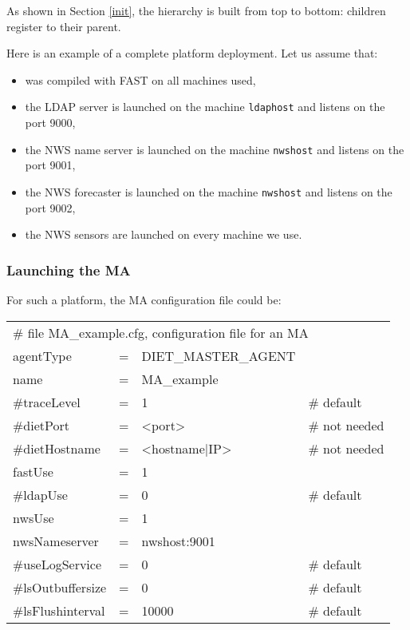 As shown in Section \ref{init}, the hierarchy is built from top to bottom:
children register to their parent.

Here is an example of a complete platform deployment. Let us assume that:

\begin{itemize}
\item \diet was compiled with FAST on all machines used,
\item the LDAP server is launched on the machine \texttt{ldaphost} and listens
  on the port 9000,
\item the NWS name server is launched on the machine \texttt{nwshost} and
  listens on the port 9001,
\item the NWS forecaster is launched on the machine \texttt{nwshost} and
  listens on the port 9002,
\item the NWS sensors are launched on every machine we use.
\end{itemize}


\subsubsection{Launching the MA}

For such a platform, the MA configuration file could be:
\tt
\begin{center}
 \footnotesize
 \begin{tabular}{lcll}
  \multicolumn{4}{l}{\# file MA\_example.cfg, configuration file for an MA}\\
  agentType     &=&DIET\_MASTER\_AGENT&\\
  name          &=&MA\_example        &\\
  \#traceLevel  &=&1                  &\# default\\
  \#dietPort    &=&<port>             &\# not needed\\
  \#dietHostname&=&<hostname|IP>      &\# not needed\\
  fastUse       &=&1                  &\\
  \#ldapUse     &=&0                  &\# default\\
  nwsUse        &=&1                  &\\
  nwsNameserver &=&nwshost:9001       &\\
  \#useLogService &=& 0               &\# default\\
  \#lsOutbuffersize &=& 0             &\# default\\
  \#lsFlushinterval &=& 10000           &\# default\\
 \end{tabular}
\end{center}
\rm

